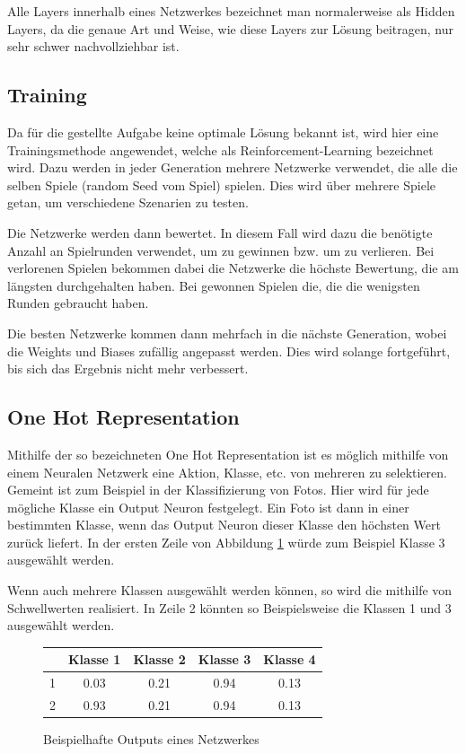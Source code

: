\documentclass[11pt, twocolumn]{article}
\begin{document}
Alle Layers innerhalb eines Netzwerkes bezeichnet man normalerweise als Hidden Layers, da die genaue Art und Weise, wie diese Layers zur Lösung beitragen, nur sehr schwer nachvollziehbar ist.


\subsection{Training}
Da für die gestellte Aufgabe keine optimale Lösung bekannt ist, wird hier eine Trainingsmethode angewendet, welche als Reinforcement-Learning bezeichnet wird. Dazu werden in jeder Generation mehrere Netzwerke verwendet, die alle die selben Spiele (random Seed vom Spiel) spielen. Dies wird über mehrere Spiele getan, um verschiedene Szenarien zu testen.

Die Netzwerke werden dann bewertet. In diesem Fall wird dazu die benötigte Anzahl an Spielrunden verwendet, um zu gewinnen bzw. um zu verlieren. Bei verlorenen Spielen bekommen dabei die Netzwerke die höchste Bewertung, die am längsten durchgehalten haben. Bei gewonnen Spielen die, die die wenigsten Runden gebraucht haben.

Die besten Netzwerke kommen dann mehrfach in die nächste Generation, wobei die Weights und Biases zufällig angepasst werden. Dies wird solange fortgeführt, bis sich das Ergebnis nicht mehr verbessert.

\subsection{One Hot Representation}
Mithilfe der so bezeichneten One Hot Representation ist es möglich mithilfe von einem Neuralen Netzwerk eine Aktion, Klasse, etc. von mehreren zu selektieren. Gemeint ist zum Beispiel in der Klassifizierung von Fotos. Hier wird für jede mögliche Klasse ein Output Neuron festgelegt. Ein Foto ist dann in einer bestimmten Klasse, wenn das Output Neuron dieser Klasse den höchsten Wert zurück liefert. In der ersten Zeile von Abbildung \ref{tab:one-hot} würde zum Beispiel Klasse 3 ausgewählt werden.

Wenn auch mehrere Klassen ausgewählt werden können, so wird die mithilfe von Schwellwerten realisiert. In Zeile 2 könnten so Beispielsweise die Klassen 1 und 3 ausgewählt werden.

\begin{figure}[h]
\centering
\begin{tabular}{|r|c|c|c|c|}
	\hline
  	& Klasse 1 & Klasse 2 & Klasse 3 & Klasse 4 \\\hline
  	1 & 0.03 & 0.21 & 0.94 & 0.13 \\\hline
  	2 & 0.93 & 0.21 & 0.94 & 0.13 \\\hline
\end{tabular}
\caption{Beispielhafte Outputs eines Netzwerkes}
\label{tab:one-hot}
\end{figure}
\end{document}

